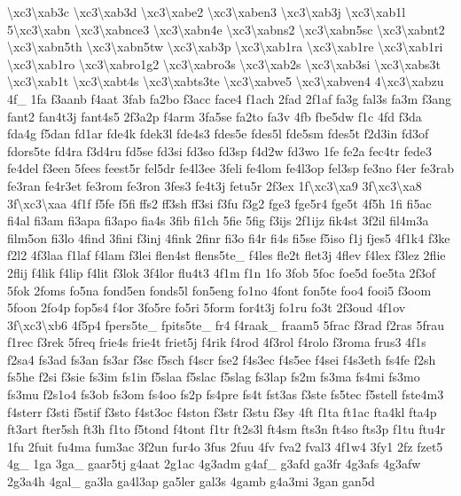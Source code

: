 \begin{DoxyCompactItemize}
\textbackslash{}xc3\textbackslash{}xab3c \textbackslash{}xc3\textbackslash{}xab3d \textbackslash{}xc3\textbackslash{}xabe2 \textbackslash{}xc3\textbackslash{}xaben3 \textbackslash{}xc3\textbackslash{}xab3j \textbackslash{}xc3\textbackslash{}xab1l 5\textbackslash{}xc3\textbackslash{}xabn \textbackslash{}xc3\textbackslash{}xabnce3 \textbackslash{}xc3\textbackslash{}xabn4e \textbackslash{}xc3\textbackslash{}xabns2 \textbackslash{}xc3\textbackslash{}xabn5sc \textbackslash{}xc3\textbackslash{}xabnt2 \textbackslash{}xc3\textbackslash{}xabn5th \textbackslash{}xc3\textbackslash{}xabn5tw \textbackslash{}xc3\textbackslash{}xab3p \textbackslash{}xc3\textbackslash{}xab1ra \textbackslash{}xc3\textbackslash{}xab1re \textbackslash{}xc3\textbackslash{}xab1ri \textbackslash{}xc3\textbackslash{}xab1ro \textbackslash{}xc3\textbackslash{}xabro1g2 \textbackslash{}xc3\textbackslash{}xabro3s \textbackslash{}xc3\textbackslash{}xab2s \textbackslash{}xc3\textbackslash{}xab3si \textbackslash{}xc3\textbackslash{}xabs3t \textbackslash{}xc3\textbackslash{}xab1t \textbackslash{}xc3\textbackslash{}xabt4s \textbackslash{}xc3\textbackslash{}xabts3te \textbackslash{}xc3\textbackslash{}xabve5 \textbackslash{}xc3\textbackslash{}xabven4 4\textbackslash{}xc3\textbackslash{}xabzu 4f\-\_\- 1fa f3aanb f4aat 3fab fa2bo f3acc face4 f1ach 2fad 2f1af fa3g fal3s fa3m f3ang fant2 fan4t3j fant4s5 2f3a2p f4arm 3fa5se fa2to fa3v 4fb fbe5dw f1c 4fd f3da fda4g f5dan fd1ar fde4k fdek3l fde4s3 fdes5e fdes5l fde5sm fdes5t f2d3in fd3of fdors5te fd4ra f3d4ru fd5se fd3si fd3so fd3sp f4d2w fd3wo 1fe fe2a fec4tr fede3 fe4del f3een 5fees feest5r fel5dr fe4l3ee 3feli fe4lom fe4l3op fel3sp fe3no f4er fe3rab fe3ran fe4r3et fe3rom fe3ron 3fes3 fe4t3j fetu5r 2f3ex 1f\textbackslash{}xc3\textbackslash{}xa9 3f\textbackslash{}xc3\textbackslash{}xa8 3f\textbackslash{}xc3\textbackslash{}xaa 4f1f f5fe f5fi ffs2 ff3sh ff3si f3fu f3g2 fge3 fge5r4 fge5t 4f5h 1fi fi5ac fi4al fi3am fi3apa fi3apo fia4s 3fib fi1ch 5fie 5fig f3ijs 2f1ijz fik4st 3f2il fil4m3a film5on fi3lo 4find 3fini f3inj 4fink 2finr fi3o fi4r fi4s fi5se f5iso f1j fjes5 4f1k4 f3ke f2l2 4f3laa f1laf f4lam f3lei flen4st flens5te\-\_\- f4les fle2t flet3j 4flev f4lex f3lez 2flie 2flij f4lik f4lip f4lit f3lok 3f4lor flu4t3 4f1m f1n 1fo 3fob 5foc foe5d foe5ta 2f3of 5fok 2foms fo5na fond5en fonds5l fon5eng fo1no 4font fon5te foo4 fooi5 f3oom 5foon 2fo4p fop5s4 f4or 3fo5re fo5ri 5form for4t3j fo1ru fo3t 2f3oud 4f1ov 3f\textbackslash{}xc3\textbackslash{}xb6 4f5p4 fpers5te\-\_\- fpits5te\-\_\- fr4 f4raak\-\_\- fraam5 5frac f3rad f2ras 5frau f1rec f3rek 5freq frie4s frie4t friet5j f4rik f4rod 4f3rol f4rolo f3roma frus3 4f1s f2sa4 fs3ad fs3an fs3ar f3sc f5sch f4scr fse2 f4s3ec f4s5ee f4sei f4s3eth fs4fe f2sh fs5he f2si f3sie fs3im fs1in f5slaa f5slac f5slag fs3lap fs2m fs3ma fs4mi fs3mo fs3mu f2s1o4 fs3ob fs3om fs4oo fs2p fs4pre fs4t fst3as f3ste fs5tec f5stell fste4m3 f4sterr f3sti f5stif f3sto f4st3oc f4ston f3str f3stu f3sy 4ft f1ta ft1ac fta4kl fta4p ft3art fter5sh ft3h f1to f5tond f4tont f1tr ft2s3l ft4sm fts3n ft4so fts3p f1tu ftu4r 1fu 2fuit fu4ma fum3ac 3f2un fur4o 3fus 2fuu 4fv fva2 fval3 4f1w4 3fy1 2fz fzet5 4g\-\_\- 1ga 3ga\-\_\- gaar5tj g4aat 2g1ac 4g3adm g4af\-\_\- g3afd ga3fr 4g3afs 4g3afw 2g3a4h 4gal\-\_\- ga3la ga4l3ap ga5ler gal3s 4gamb g4a3mi 3gan gan5d 
\end{DoxyCompactItemize}
